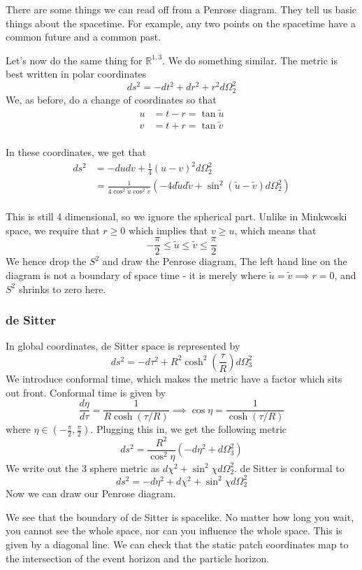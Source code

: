 There are some things we can read off
from a Penrose diagram. They tell us 
basic things about the spacetime.
For example, any two points on the spacetime 
have a common future and a common past. 

Let's now do the same thing 
for $ \mathbb{ R} ^{ 1, 3 } $. 
We do something similar. 
The metric is best written in 
polar coordinates 
\[
 ds ^ 2 = - dt ^ 2 + d r ^ 2 + r ^ 2 d \Omega^ 2 _ 2 
\] We, as before, 
do a change of coordinates so that 
\begin{align*}
	u &=  t - r = \tan \tilde{ u }   \\
	v &=  t + r  =  \tan \tilde{ v }   \\
\end{align*}

In these coordinates, we get that 
\begin{align*}
	ds ^ 2 &=  - d u dv + \frac{1}{4 } ( u - v ) ^ 2 d \Omega_ 2 ^ 2  \\
	       &=  \frac{1}{4 \cos^ 2 \tilde{ u } \cos ^ 2 \tilde{ v }   } \left(  
	       - 4 d \tilde{ u } d \tilde{ v } + \sin ^ 2 ( \tilde{ u } - \tilde{ v } ) d \Omega _ 2 ^ 2     \right)  \\
\end{align*}

This is still 4 dimensional, so we ignore the spherical part. 
Unlike in Minkwoski space, we require that $ r \geq 0 $ which implies that 
$ v \geq u $, which means that 
\[
  - \frac{\pi}{2 } \leq \tilde{ u } \leq \tilde{ v } \leq \frac{\pi}{2 }   
\] We hence drop the $ S ^ 2 $ and draw the Penrose diagram, 
The left hand line on the diagram 
is not a boundary of space time - it is 
merely where $ \tilde{ u }  = \tilde{ v } \implies r = 0   $, 
and $ S ^ 2$ shrinks to zero here.

\subsubsection{de Sitter} 
In global coordinates, de Sitter space 
is represented by 
\[
 ds ^ 2 = - d \tau ^ 2 + R ^ 2 \cosh ^ 2 \left(  \frac{ \tau }{ R }  \right)  d \Omega_ 3 ^ 2 
\] We introduce conformal time, 
which makes the metric have a factor which sits out front.
Conformal time is given by 
\[
	\frac{ d \eta }{ d \tau }  = \frac{1}{ R \cosh \left(  \tau / R  \right)  } 
	\implies \cos \eta = \frac{1}{\cosh \left(  \tau /  R  \right) }
\] where $ \eta \in ( - \frac{\pi}{2 } , \frac{\pi}{2 } ) $. 
Plugging this in, 
we get the following metric 
\[
	ds ^ 2= \frac{R ^ 2 }{ \cos^ 2 \eta } \left(  
	 - d \eta ^ 2 + d \Omega_ 3 ^ 2 \right)  
\] We write out the 3 sphere metric as $ d \chi ^ 2  + \sin ^ 2 \chi d \Omega _ 2 ^2 $. 
de Sitter is conformal to 
\[
 ds ^ 2 = - d \eta ^ 2 + d \chi ^ 2 + \sin ^ 2 \chi  d \Omega_2 ^ 2 
\] Now we can draw our Penrose diagram. 

We see that the boundary of de Sitter 
is spacelike. 
No matter how long you wait, you cannot 
see the whole space, nor can you influence 
the whole space. This is given by a diagonal line. 
We can check that the static patch coordinates map to 
the intersection of the event horizon and the particle horizon. 
